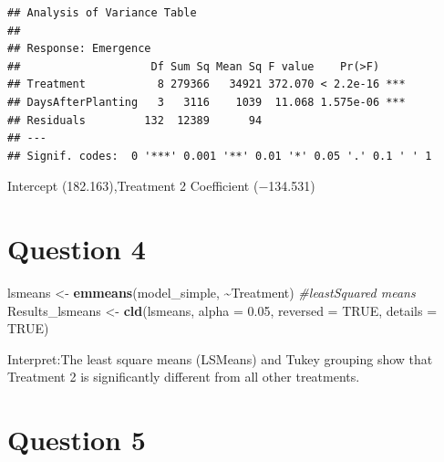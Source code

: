 \documentclass[
]{article}
\newenvironment{Shaded}{\begin{snugshade}}{\end{snugshade}}
\newcommand{\AttributeTok}[1]{\textcolor[rgb]{0.13,0.29,0.53}{#1}}
\newcommand{\CommentTok}[1]{\textcolor[rgb]{0.56,0.35,0.01}{\textit{#1}}}
\newcommand{\ConstantTok}[1]{\textcolor[rgb]{0.56,0.35,0.01}{#1}}
\newcommand{\FloatTok}[1]{\textcolor[rgb]{0.00,0.00,0.81}{#1}}
\newcommand{\FunctionTok}[1]{\textcolor[rgb]{0.13,0.29,0.53}{\textbf{#1}}}
\newcommand{\NormalTok}[1]{#1}
\newcommand{\OtherTok}[1]{\textcolor[rgb]{0.56,0.35,0.01}{#1}}
\newcommand{\SpecialCharTok}[1]{\textcolor[rgb]{0.81,0.36,0.00}{\textbf{#1}}}
\begin{document}
\begin{verbatim}
## Analysis of Variance Table
## 
## Response: Emergence
##                    Df Sum Sq Mean Sq F value    Pr(>F)    
## Treatment           8 279366   34921 372.070 < 2.2e-16 ***
## DaysAfterPlanting   3   3116    1039  11.068 1.575e-06 ***
## Residuals         132  12389      94                      
## ---
## Signif. codes:  0 '***' 0.001 '**' 0.01 '*' 0.05 '.' 0.1 ' ' 1
\end{verbatim}

Intercept (182.163),Treatment 2 Coefficient (−134.531)

\section{Question 4}\label{question-4}

\begin{Shaded}
\begin{Highlighting}[]
\NormalTok{lsmeans }\OtherTok{\textless{}{-}} \FunctionTok{emmeans}\NormalTok{(model\_simple, }\SpecialCharTok{\textasciitilde{}}\NormalTok{Treatment) }\CommentTok{\#leastSquared means}
\NormalTok{Results\_lsmeans }\OtherTok{\textless{}{-}} \FunctionTok{cld}\NormalTok{(lsmeans, }\AttributeTok{alpha =} \FloatTok{0.05}\NormalTok{, }\AttributeTok{reversed =} \ConstantTok{TRUE}\NormalTok{, }\AttributeTok{details =} \ConstantTok{TRUE}\NormalTok{)}
\end{Highlighting}
\end{Shaded}

Interpret:The least square means (LSMeans) and Tukey grouping show that
Treatment 2 is significantly different from all other treatments.

\section{Question 5}\label{question-5}
\end{document}

